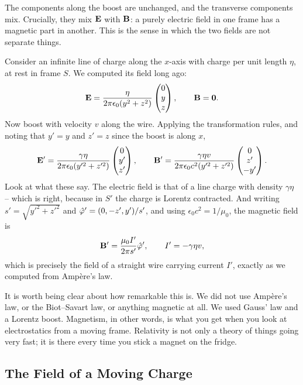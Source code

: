 \documentclass[a4paper]{scrartcl}
\newcommand{\hh}[1]{\hat{\vv{#1}}}
\begin{document}
The components along the boost are unchanged, and the transverse components mix. Crucially, they mix $\mathbf{E}$ with $\mathbf{B}$: a purely electric field in one frame has a magnetic part in another. This is the sense in which the two fields are not separate things.

\begin{example}
	Consider an infinite line of charge along the $x$-axis with charge per unit length $\eta$, at rest in frame $S$. We computed its field long ago:
	$$
	\mathbf{E} = \frac{\eta}{2\pi\epsilon_0(y^2+z^2)}\begin{pmatrix} 0\\ y\\ z\end{pmatrix}, \qquad \mathbf{B} = \mathbf{0}.
	$$
	Now boost with velocity $v$ along the wire. Applying the transformation rules, and noting that $y' = y$ and $z' = z$ since the boost is along $x$,
	$$
	\mathbf{E}' = \frac{\gamma\eta}{2\pi\epsilon_0(y'^2+z'^2)}\begin{pmatrix} 0\\y'\\z'\end{pmatrix}, \qquad \mathbf{B}' = \frac{\gamma \eta v}{2\pi\epsilon_0 c^2 (y'^2+z'^2)}\begin{pmatrix} 0\\ z'\\ -y'\end{pmatrix}.
	$$
	Look at what these say. The electric field is that of a line charge with density $\gamma\eta$ -- which is right, because in $S'$ the charge is Lorentz contracted. And writing $s' = \sqrt{y'^2+z'^2}$ and $\hh{\varphi}' = (0,-z',y')/s'$, and using $\epsilon_0 c^2 = 1/\mu_0$, the magnetic field is
	$$
	\vv{B}' = \frac{\mu_0 I'}{2\pi s'}\hh{\varphi}', \qquad I' = -\gamma\eta v,
	$$
	which is precisely the field of a straight wire carrying current $I'$, exactly as we computed from Amp\`ere's law.

	It is worth being clear about how remarkable this is. We did not use Amp\`ere's law, or the Biot--Savart law, or anything magnetic at all. We used Gauss' law and a Lorentz boost. Magnetism, in other words, is what you get when you look at electrostatics from a moving frame. Relativity is not only a theory of things going very fast; it is there every time you stick a magnet on the fridge.
\end{example}

\subsection{The Field of a Moving Charge}
\end{document}

